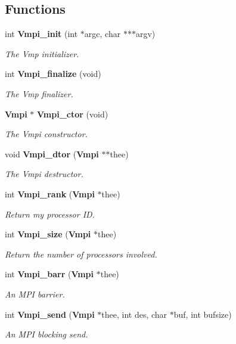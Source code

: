 \subsection*{Functions}
\begin{DoxyCompactItemize}
\item 
int {\bf Vmpi\-\_\-init} (int $\ast$argc, char $\ast$$\ast$$\ast$argv)
\begin{DoxyCompactList}\small\item\em The Vmp initializer. \end{DoxyCompactList}\item 
int {\bf Vmpi\-\_\-finalize} (void)
\begin{DoxyCompactList}\small\item\em The Vmp finalizer. \end{DoxyCompactList}\item 
{\bf Vmpi} $\ast$ {\bf Vmpi\-\_\-ctor} (void)
\begin{DoxyCompactList}\small\item\em The Vmpi constructor. \end{DoxyCompactList}\item 
void {\bf Vmpi\-\_\-dtor} ({\bf Vmpi} $\ast$$\ast$thee)
\begin{DoxyCompactList}\small\item\em The Vmpi destructor. \end{DoxyCompactList}\item 
int {\bf Vmpi\-\_\-rank} ({\bf Vmpi} $\ast$thee)
\begin{DoxyCompactList}\small\item\em Return my processor I\-D. \end{DoxyCompactList}\item 
int {\bf Vmpi\-\_\-size} ({\bf Vmpi} $\ast$thee)
\begin{DoxyCompactList}\small\item\em Return the number of processors involved. \end{DoxyCompactList}\item 
int {\bf Vmpi\-\_\-barr} ({\bf Vmpi} $\ast$thee)
\begin{DoxyCompactList}\small\item\em An M\-P\-I barrier. \end{DoxyCompactList}\item 
int {\bf Vmpi\-\_\-send} ({\bf Vmpi} $\ast$thee, int des, char $\ast$buf, int bufsize)
\begin{DoxyCompactList}\small\item\em An M\-P\-I blocking send. \end{DoxyCompactList}\item 
$$
\end{DoxyCompactItemize}
